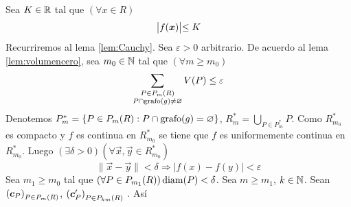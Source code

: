 \begin{demostracion}
Sea $ K \in \mathbb{R} $ tal que $ ( \forall x \in R ) $
\begin{equation}\label{equ:cota}
    \bigr\lvert f(\boldsymbol{x})\bigl\rvert \leq K
\end{equation}
Recurriremos al lema \ref{lem:Cauchy}. Sea $ \varepsilon
> 0 $ arbitrario. De acuerdo al lema \ref{lem:volumencero}, sea $
m_0\in \mathbb{N} $ tal que $ (\forall m \geq m_0) $
\begin{equation}\label{equ:volumen:cero}
    \sum_{\substack{P \in P_{m}(R) \\ P \cap
    \operatorname{grafo}(g) \neq \varnothing}} V(P) \leq \varepsilon
\end{equation}
Denotemos $ P^*_m = \{ P \in P_{m}(R) : P \cap \operatorname{grafo}(g) =
\varnothing \} $, $ R_m^* = \bigcup_{P \in P^*_m} P $. Como $
R_{m_0}^* $ es compacto y $ f $ es continua en $ R_{m_0}^* $ se
tiene que
$ f $ es uniformemente continua en $ R_{m_0}^* $. Luego $ (\exists
\delta > 0)(\forall \vec{x},\vec{y} \in R_{m_0}^*)$
\begin{equation}\label{equ:unif:continuidad}
\|\vec{x}-\vec{y}\| < \delta \Rightarrow |f(x) - f(y)| < \varepsilon
\end{equation}
Sea $ m_1 \geq m_0 $ tal que $ (\forall P \in
P_{m_1}(R))\operatorname{diam}(P) < \delta $. %
Sea $ m \geq m_1 $, $k\in \mathbb{N}$. Sean ${(\boldsymbol{c}_P)}_{P \in
P_{m}(R)}$, $ {(\boldsymbol{c}'_P)}_{P \in P_{km}(R)} $ \familiasEleccion{}.
As\'i

\end{demostracion}
